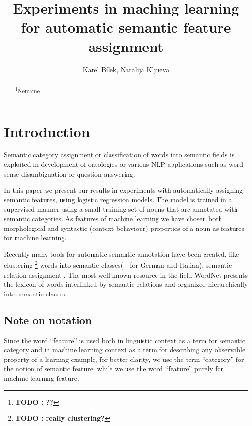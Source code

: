 \documentclass[letterpaper]{article}
\newcommand{\todofn}[1] {
 \footnote{\textbf{TODO : #1}}}
\begin{document}
%

\title{Experiments in maching learning for automatic semantic feature assignment}
\author{Karel Bílek, Natalija Kljueva}
\maketitle
\begin{abstract}
\todofn{??}Nemáme
\end{abstract}


\section{Introduction}

Semantic category assignment or classification of words into semantic fields
is exploited in development of ontologies or various NLP applications such as
word sense disambiguation or question-answering.

In this paper we present our results in experiments with automatically assigning semantic features,
using logistic regression models. The model is trained in a supervised manner
using a small training set of nouns that are annotated with semantic categories.
As features of machine learning 
we have chosen both morphological and syntactic (context behaviour) properties 
of a noun as features for machine learning.

Recently many tools for automatic semantic annotation have been created, like
clustering \todofn{really clustering?} words into semantic classes(\cite{baroni:2009} - for German and Italian), 
semantic relation assignment \cite{peirsman}. The most well-known resource
in the field WordNet \cite{wordnet} presents the lexicon of words
interlinked by semantic relations and organized hierarchically into 
semantic classes. 

\subsection{Note on notation}
Since the word ``feature'' is used both in linguistic context as a term for semantic category and in 
machine learning context as a term for describing any observable property of a learning example, for 
better clarity, we use the term ``category'' for the notion of semantic feature, 
while we use the word ``feature'' purely for machine learning feature.
\end{document}
